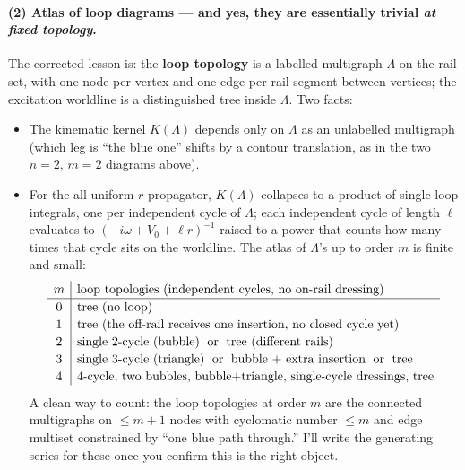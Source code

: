 \documentclass[11pt,a4paper]{article}
\begin{document}
\paragraph{(2) Atlas of loop diagrams --- and yes, they are essentially
trivial \emph{at fixed topology}.}
The corrected lesson is: the \textbf{loop topology} is a labelled
multigraph $\Lambda$ on the rail set, with one node per vertex and one
edge per rail-segment between vertices; the excitation worldline is a
distinguished tree inside $\Lambda$. Two facts:
\begin{itemize}[leftmargin=2em,itemsep=2pt]
\item The kinematic kernel $K(\Lambda)$ depends only on $\Lambda$ as an
unlabelled multigraph (which leg is ``the blue one'' shifts by a contour
translation, as in the two $n{=}2,\,m{=}2$ diagrams above).
\item For the all-uniform-$r$ propagator, $K(\Lambda)$ collapses to a
product of single-loop integrals, one per independent cycle of $\Lambda$;
each independent cycle of length $\ell$ evaluates to $(-i\omega+V_{0}+\ell r)^{-1}$
raised to a power that counts how many times that cycle sits on the
worldline. The atlas of $\Lambda$'s up to order $m$ is finite and small:
\[
\renewcommand{\arraystretch}{1.15}
\begin{array}{c|l}
\text{$m$} & \text{loop topologies (independent cycles, no on-rail dressing)}\\
\hline
0 & \text{tree (no loop)}\\
1 & \text{tree (the off-rail receives one insertion, no closed cycle yet)}\\
2 & \text{single 2-cycle (bubble) \;or\; tree (different rails)}\\
3 & \text{single 3-cycle (triangle) \;or\; bubble + extra insertion \;or\; tree}\\
4 & \text{4-cycle, two bubbles, bubble+triangle, single-cycle dressings, tree}\\
\end{array}
\]
A clean way to count: the loop topologies at order $m$ are the connected
multigraphs on $\leq m{+}1$ nodes with cyclomatic number $\leq m$ and edge
multiset constrained by ``one blue path through.'' I'll write the
generating series for these once you confirm this is the right object.
\end{itemize}
\end{document}
